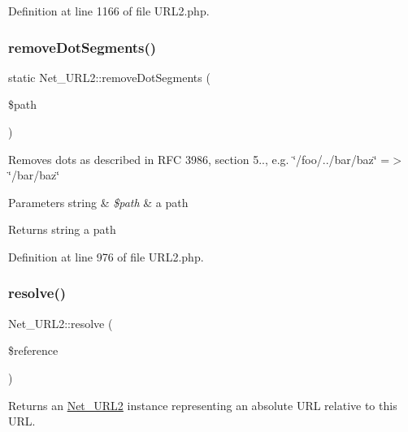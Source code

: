 Definition at line 1166 of file U\+R\+L2.\+php.

\mbox{\label{classNet__URL2_aa2ca379f950f6e7a3932121ad39c0e5a}} 
\subsubsection{\texorpdfstring{remove\+Dot\+Segments()}{removeDotSegments()}}
{\footnotesize\ttfamily static Net\+\_\+\+U\+R\+L2\+::remove\+Dot\+Segments (\begin{DoxyParamCaption}\item[{}]{\$path }\end{DoxyParamCaption})\hspace{0.3cm}{\ttfamily [static]}}

Removes dots as described in R\+FC 3986, section 5.., e.\+g. \char`\"{}/foo/../bar/baz\char`\"{} =$>$ \char`\"{}/bar/baz\char`\"{}


\begin{DoxyParams}[1]{Parameters}
string & {\em \$path} & a path\\
\hline
\end{DoxyParams}
\begin{DoxyReturn}{Returns}
string a path 
\end{DoxyReturn}


Definition at line 976 of file U\+R\+L2.\+php.

\mbox{\label{classNet__URL2_a8630ab79fad624b2fd5b0df2e9123c0a}} 
\subsubsection{\texorpdfstring{resolve()}{resolve()}}
{\footnotesize\ttfamily Net\+\_\+\+U\+R\+L2\+::resolve (\begin{DoxyParamCaption}\item[{}]{\$reference }\end{DoxyParamCaption})}

Returns an \hyperlink{classNet__URL2}{Net\+\_\+\+U\+R\+L2} instance representing an absolute U\+RL relative to this U\+RL.



